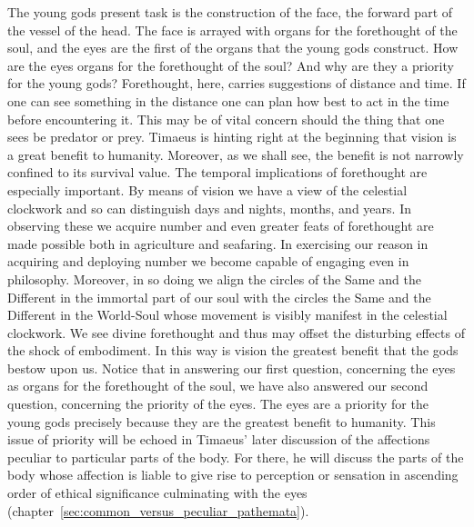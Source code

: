 The young gods present task is the construction of the face, the forward part of the vessel of the head. The face is arrayed with organs for the forethought of the soul, and the eyes are the first of the organs that the young gods construct. How are the eyes organs for the forethought of the soul? And why are they a priority for the young gods? Forethought, here, carries suggestions of distance and time. If one can see something in the distance one can plan how best to act in the time before encountering it. This may be of vital concern should the thing that one sees be predator or prey. Timaeus is hinting right at the beginning that vision is a great benefit to humanity. Moreover, as we shall see, the benefit is not narrowly confined to its survival value. The temporal implications of forethought are especially important. By means of vision we have a view of the celestial clockwork and so can distinguish days and nights, months, and years. In observing these we acquire number and even greater feats of forethought are made possible both in agriculture and seafaring. In exercising our reason in acquiring and deploying number we become capable of engaging even in philosophy. Moreover, in so doing we align the circles of the Same and the Different in the immortal part of our soul with the circles the Same and the Different in the World-Soul whose movement is visibly manifest in the celestial clockwork. We see divine forethought and thus may offset the disturbing effects of the shock of embodiment. In this way is vision the greatest benefit that the gods bestow upon us. Notice that in answering our first question, concerning the eyes as organs for the forethought of the soul, we have also answered our second question, concerning the priority of the eyes. The eyes are a priority for the young gods precisely because they are the greatest benefit to humanity. This issue of priority will be echoed in Timaeus' later discussion of the affections peculiar to particular parts of the body. For there, he will discuss the parts of the body whose affection is liable to give rise to perception or sensation in ascending order of ethical significance culminating with the eyes (chapter~\ref{sec:common_versus_peculiar_pathemata}).


